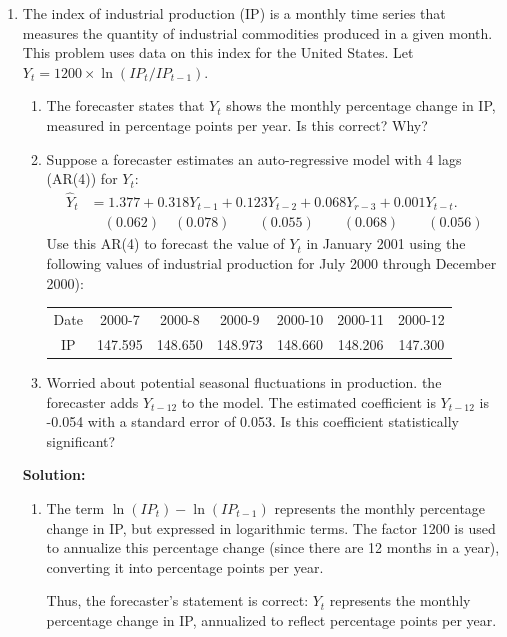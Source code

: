 \documentclass[12pt]{article}
\begin{document}
\begin{enumerate}
\item The index of industrial production (IP) is a monthly time series that measures the quantity of industrial commodities produced in a given month. This problem uses data on this index for the United States. Let $Y_t = 1200\times \ln(IP_t/IP_{t-1})$. 
\begin{enumerate}
\item The forecaster states that $Y_{t}$ shows the monthly percentage change in IP, measured in percentage points per year. Is this correct? Why?
    \item Suppose a forecaster estimates an auto-regressive model with 4 lags (AR(4)) for $Y_t$:
$$
\begin{aligned}
\hat{Y}_t & =1.377+0.318 Y_{t-1}+0.123 Y_{t-2}+0.068 Y_{r-3}+0.001 Y_{t-t} . \\
& \quad(0.062)\quad (0.078) \quad\quad(0.055) \quad \quad(0.068) \quad \quad(0.056)
\end{aligned}
$$
Use this AR(4) to forecast the value of $Y_{t}$ in January 2001 using the following values of industrial production for July 2000 through December 2000):
    \begin{center}
\begin{tabular}{|c|c|c|c|c|c|c|}
\hline Date & 2000-7 & 2000-8 & 2000-9 & 2000-10 & 2000-11 & 2000-12 \\
IP & 147.595 & 148.650 & 148.973 & 148.660 & 148.206 & 147.300 \\
\hline
\end{tabular}
\end{center}
\item Worried about potential seasonal fluctuations in production. the forecaster adds $Y_{t-12}$ to the model. The estimated coefficient is $Y_{t-12}$ is -0.054 with a standard error of 0.053. Is this coefficient statistically significant?
\end{enumerate}


{\color{blue}
\noindent \textbf{Solution:}

\begin{enumerate}
    \item The term \( \ln(IP_t) - \ln(IP_{t-1}) \) represents the monthly percentage change in IP, but expressed in logarithmic terms. The factor 1200 is used to annualize this percentage change (since there are 12 months in a year), converting it into percentage points per year.

    Thus, the forecaster's statement is correct: \( Y_t \) represents the monthly percentage change in IP, annualized to reflect percentage points per year.


\end{enumerate}}
\end{enumerate}
\end{document}
